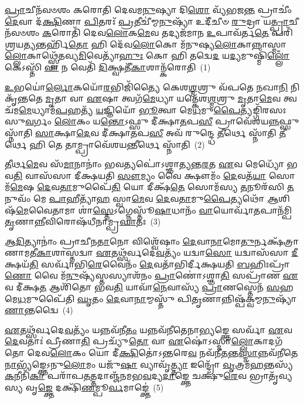 \setcounter{anuvakam}{0}
\-\ul{𑌪𑍍𑌰𑌾}\-𑌚𑍀𑌨᳴𑌵𑍞𑌶𑌂 𑌕𑌰𑍋𑌤𑌿 𑌦𑍇𑌵𑌮\-\ul{𑌨𑍁}\-𑌷𑍍𑌯𑌾 𑌦𑌿\-\ul{𑌶𑍋} 𑌵𑍍𑌯᳴𑌭𑌜\-\ul{𑌨𑍍𑌤} 𑌪𑍍𑌰𑌾𑌚𑍀𑌂॑ \ul{𑌦𑍇}\-𑌵𑌾 𑌦᳴\-\ul{𑌕𑍍𑌷𑌿}\-𑌣𑌾 \ul{𑌪𑌿}\-𑌤𑌰𑌃᳴ \ul{𑌪𑍍𑌰}\-𑌤𑍀𑌚𑍀॑𑌮𑍍𑌮\-\ul{𑌨𑍁}\-𑌷𑍍𑌯𑌾᳴ 𑌉𑌦𑍀᳴𑌚𑍀𑍞 \ul{𑌰𑍁}\-𑌦𑍍𑌰𑌾 𑌯\-\ul{𑌤𑍍𑌪𑍍𑌰𑌾}\-𑌚𑍀𑌨᳴𑌵𑍞𑌶𑌂 \ul{𑌕}\-𑌰𑍋𑌤𑌿᳴ 𑌦𑍇𑌵\-\ul{𑌲𑍋}\-𑌕\-\ul{𑌮𑍇}\-𑌵 𑌤𑌦𑍍𑌯𑌜᳴𑌮𑌾𑌨 \ul{𑌉}\-𑌪𑌾𑌵᳴𑌰𑍍𑌤\-\ul{𑌤𑍇} 𑌪𑌰𑌿᳴ 𑌶𑍍𑌰𑌯\-\ul{𑌤𑍍𑌯}\-𑌨𑍍𑌤𑌰𑍍\mbox{}𑌹𑌿᳴\-\ul{𑌤𑍋} 𑌹𑌿 𑌦𑍇᳴𑌵\-\ul{𑌲𑍋}\-𑌕𑍋 𑌮᳴𑌨𑍁𑌷𑍍𑌯\-\ul{𑌲𑍋}\-𑌕𑌾\-𑌨𑍍𑌨𑌾𑌸𑍍𑌮𑌾\-\ul{𑌲𑍍𑌲𑍋}\-𑌕𑌾𑌥𑍍𑌸𑍍𑌵𑍇᳴𑌤𑌵𑍍𑌯\-\ul{𑌮𑌿}\-𑌵𑍇𑌤𑍍𑌯𑌾᳴\-\ul{𑌹𑍁𑌃} 𑌕𑍋 𑌹𑌿 𑌤𑌦𑍍𑌵𑍇\-\ul{𑌦} 𑌯\-\ul{𑌦𑍍𑌯}\-𑌮𑍁𑌷𑍍𑌮𑌿᳴\-\ul{𑌲𑍍𑌲𑍋𑌁}\-𑌕𑍇\-𑌽𑌸𑍍𑌤𑌿᳴ \ul{𑌵𑌾} 𑌨 𑌵𑍇𑌤𑌿᳴ \ul{𑌦𑌿}\-𑌕𑍍𑌷𑍍𑌵𑌤𑍀᳴\-\ul{𑌕𑌾}\-𑌶𑌾𑌨𑍍𑌕᳴𑌰𑍋𑌤𑌿~(1)

\-\ul{𑌉}\-𑌭𑌯𑍋॑\-\ul{𑌰𑍍𑌲𑍋}\-𑌕𑌯𑍋᳴\-\ul{𑌰}\-𑌭𑌿𑌜𑌿᳴𑌤𑍍𑌯𑍈 𑌕𑍇𑌶\-\ul{𑌶𑍍𑌮}\-𑌶𑍍𑌰𑍁 𑌵᳴𑌪𑌤𑍇 \ul{𑌨}\-𑌖𑌾\-\ul{𑌨𑌿} 𑌨𑌿 𑌕𑍃᳴𑌨𑍍𑌤𑌤𑍇 \ul{𑌮𑍃}\-𑌤𑌾 𑌵𑌾 \ul{𑌏}\-𑌷𑌾 𑌤𑍍𑌵𑌗᳴\-\ul{𑌮𑍇}\-𑌧𑍍𑌯𑌾 𑌯𑌤𑍍𑌕𑍇᳴𑌶\-\ul{𑌶𑍍𑌮}\-𑌶𑍍𑌰𑍁 \ul{𑌮𑍃}\-𑌤𑌾\-\ul{𑌮𑍇}\-𑌵 𑌤𑍍𑌵𑌚᳴𑌮\-\ul{𑌮𑍇}\-𑌧𑍍𑌯𑌾𑌮᳴\-\ul{𑌪}\-𑌹𑌤𑍍𑌯᳴ \ul{𑌯}\-𑌜𑍍𑌞𑌿𑌯𑍋᳴ \ul{𑌭𑍂}\-𑌤𑍍𑌵𑌾 𑌮𑍇\-\ul{𑌧}\-𑌮𑍁\-\ul{𑌪𑍈}\-𑌤𑍍𑌯𑌙𑍍𑌗𑌿᳴𑌰𑌸𑌃 𑌸𑍁\-\ul{𑌵}\-𑌰𑍍𑌗𑌂 \ul{𑌲𑍋}\-𑌕𑌂 𑌯\-\ul{𑌨𑍍𑌤𑍋}\-\-𑌽𑌫𑍍𑌸𑍁 𑌦𑍀॑𑌕𑍍𑌷𑌾\-\ul{𑌤}\-𑌪\-\ul{𑌸𑍀} 𑌪𑍍𑌰𑌾𑌵𑍇᳴𑌶𑌯\-\ul{𑌨𑍍𑌨}\-𑌫𑍍𑌸𑍁 𑌸𑍍𑌨𑌾᳴𑌤𑌿 \ul{𑌸𑌾}\-𑌕𑍍𑌷𑌾\-\ul{𑌦𑍇}\-𑌵 𑌦𑍀॑𑌕𑍍𑌷𑌾\-\ul{𑌤}\-𑌪\-\ul{𑌸𑍀} 𑌅𑌵᳴ 𑌰𑍁𑌨𑍍𑌦𑍍𑌧𑍇 \ul{𑌤𑍀}\-𑌰𑍍𑌥𑍇 𑌸𑍍𑌨𑌾᳴𑌤𑌿 \ul{𑌤𑍀}\-𑌰𑍍𑌥𑍇 𑌹𑌿 𑌤𑍇 𑌤𑌾𑌮𑍍𑌪𑍍𑌰𑌾𑌵𑍇᳴𑌶𑌯\-\ul{𑌨𑍍𑌤𑍀}\-𑌰𑍍𑌥𑍇 𑌸𑍍𑌨𑌾᳴𑌤𑌿~(2)

\-\ul{𑌤𑍀}\-𑌰𑍍𑌥\-\ul{𑌮𑍇}\-𑌵 𑌸᳴\-\ul{𑌮𑌾}\-𑌨𑌾𑌨𑌾𑌂॑ 𑌭𑌵\-\ul{𑌤𑍍𑌯}\-𑌪𑍋॑\-𑌽𑌶𑍍𑌞𑌾𑌤𑍍𑌯𑌨𑍍𑌤\-\ul{𑌰}\-𑌤 \ul{𑌏}\-𑌵 𑌮𑍇𑌧𑍍𑌯𑍋᳴ 𑌭𑌵\-\ul{𑌤𑌿} 𑌵𑌾𑌸᳴𑌸𑌾 𑌦𑍀𑌕𑍍𑌷𑌯𑌤𑌿 \ul{𑌸𑍗}\-𑌮𑍍𑌯𑌂 𑌵𑍈 𑌕𑍍𑌷𑍗𑌮𑌂᳴ \ul{𑌦𑍇}\-𑌵𑌤᳴\-\ul{𑌯𑌾} 𑌸𑍋𑌮᳴\-\ul{𑌮𑍇}\-𑌷 \ul{𑌦𑍇}\-𑌵\-\ul{𑌤𑌾}\-𑌮𑍁𑌪𑍈᳴\-\ul{𑌤𑌿} 𑌯𑍋 𑌦𑍀𑌕𑍍𑌷᳴\-\ul{𑌤𑍇} 𑌸𑍋𑌮᳴𑌸𑍍𑌯 \ul{𑌤}\-𑌨𑍂𑌰᳴𑌸𑌿 \ul{𑌤}\-𑌨𑍁𑌵𑌂᳴ 𑌮𑍇 \ul{𑌪𑌾}\-𑌹𑍀𑌤𑍍𑌯𑌾᳴\-\ul{𑌹} 𑌸𑍍𑌵𑌾\-\ul{𑌮𑍇}\-𑌵 \ul{𑌦𑍇}\-𑌵\-\ul{𑌤𑌾}\-𑌮𑍁\-\ul{𑌪𑍈}\-𑌤𑍍𑌯𑌥𑍋᳴ \ul{𑌆}\-𑌶𑌿𑌷᳴\-\ul{𑌮𑍇}\-𑌵𑍈𑌤𑌾𑌮𑌾 𑌶𑌾॑\-\ul{𑌸𑍍𑌤𑍇}\-\-𑌽𑌗𑍍𑌨𑍇𑌸𑍍𑌤𑍂᳴\-\ul{𑌷𑌾}\-𑌧𑌾𑌨𑌂᳴ \ul{𑌵𑌾}\-𑌯𑍋𑌰𑍍𑌵𑌾᳴\-\ul{𑌤}\-𑌪𑌾𑌨᳴𑌮𑍍𑌪𑌿\-\ul{𑌤𑍃}\-𑌣𑌾\-\ul{𑌨𑍍𑌨𑍀}\-𑌵𑌿𑌰𑍋𑌷᳴𑌧𑍀𑌨𑌾𑌮𑍍𑌪𑍍𑌰\-\ul{𑌘𑌾}\-𑌤𑌃~(3)

\-\ul{𑌆}\-\-\ul{𑌦𑌿}\-𑌤𑍍𑌯𑌾𑌨𑌾𑌂॑ 𑌪𑍍𑌰𑌾𑌚𑍀𑌨\-\ul{𑌤𑌾}\-𑌨𑍋 𑌵𑌿𑌶𑍍𑌵𑍇᳴𑌷𑌾𑌂 \ul{𑌦𑍇}\-𑌵𑌾\-\ul{𑌨𑌾}\-𑌮𑍋\-\ul{𑌤𑍁}\-𑌰𑍍𑌨𑌕𑍍𑌷᳴𑌤𑍍𑌰𑌾𑌣𑌾𑌮𑌤𑍀\-\ul{𑌕𑌾}\-𑌶𑌾𑌸𑍍𑌤𑌦𑍍𑌵𑌾 \ul{𑌏}\-𑌤𑌥𑍍𑌸᳴𑌰𑍍𑌵𑌦𑍇\-\ul{𑌵}\-𑌤𑍍𑌯𑌂᳴ 𑌯𑌦𑍍𑌵𑌾\-\ul{𑌸𑍋} 𑌯𑌦𑍍𑌵𑌾𑌸᳴𑌸𑌾 \ul{𑌦𑍀}\-𑌕𑍍𑌷𑌯᳴\-\ul{𑌤𑌿} 𑌸𑌰𑍍𑌵𑌾᳴𑌭𑌿\-\ul{𑌰𑍇}\-𑌵𑍈𑌨𑌂᳴ \ul{𑌦𑍇}\-𑌵𑌤𑌾᳴𑌭𑌿𑌰𑍍𑌦𑍀𑌕𑍍𑌷𑌯𑌤𑌿 \ul{𑌬}\-𑌹𑌿𑌃𑌪𑍍𑌰𑌾᳴\-\ul{𑌣𑍋} 𑌵𑍈 𑌮᳴\-\ul{𑌨𑍁}\-𑌷𑍍𑌯᳴𑌸𑍍𑌤𑌸𑍍𑌯𑌾𑌶᳴𑌨𑌂 \ul{𑌪𑍍𑌰𑌾}\-𑌣𑍋॑\-𑌽𑌶𑍍𑌞𑌾\-\ul{𑌤𑌿} 𑌸𑌪𑍍𑌰𑌾᳴𑌣 \ul{𑌏}\-𑌵 𑌦𑍀॑𑌕𑍍𑌷\-\ul{𑌤} 𑌆𑌶𑌿᳴𑌤𑍋 𑌭𑌵\-\ul{𑌤𑌿} 𑌯𑌾𑌵𑌾᳴\-\ul{𑌨𑍇}\-𑌵𑌾𑌸𑍍𑌯᳴ \ul{𑌪𑍍𑌰𑌾}\-𑌣𑌸𑍍𑌤𑍇𑌨᳴ \ul{𑌸}\-𑌹 𑌮𑍇\-\ul{𑌧}\-𑌮𑍁𑌪𑍈᳴𑌤𑌿 \ul{𑌘𑍃}\-𑌤𑌂 \ul{𑌦𑍇}\-𑌵𑌾\-\ul{𑌨𑌾}\-𑌮𑍍𑌮𑌸𑍍𑌤𑍁᳴ 𑌪𑌿\-\ul{𑌤𑍃}\-𑌣𑌾𑌨𑍍𑌨𑌿𑌷𑍍𑌪᳴𑌕𑍍𑌵𑌮𑍍𑌮\-\ul{𑌨𑍁}\-𑌷𑍍𑌯𑌾᳴\-\ul{𑌣𑌾}\-𑌨𑍍𑌤𑌦𑍍𑌵𑍈~(4)

\-\ul{𑌏}\-𑌤𑌥𑍍𑌸᳴𑌰𑍍𑌵𑌦𑍇\-\ul{𑌵}\-𑌤𑍍𑌯𑌂᳴ 𑌯𑌨𑍍𑌨𑌵᳴𑌨𑍀\-\ul{𑌤𑌂} 𑌯𑌨𑍍𑌨𑌵᳴𑌨𑍀𑌤𑍇𑌨𑌾\-\ul{𑌭𑍍𑌯}\-𑌙𑍍𑌕𑍍𑌤𑍇 𑌸𑌰𑍍𑌵𑌾᳴ \ul{𑌏}\-𑌵 \ul{𑌦𑍇}\-𑌵𑌤𑌾𑌃॑ 𑌪𑍍𑌰𑍀𑌣𑌾\-\ul{𑌤𑌿} 𑌪𑍍𑌰𑌚𑍍𑌯𑍁᳴\-\ul{𑌤𑍋} 𑌵𑌾 \ul{𑌏}\-𑌷𑍋॑\-𑌽𑌸𑍍𑌮𑌾\-\ul{𑌲𑍍𑌲𑍋}\-𑌕𑌾𑌦𑌗᳴𑌤𑍋 𑌦𑍇𑌵\-\ul{𑌲𑍋}\-𑌕𑌂 𑌯𑍋 𑌦𑍀॑\-\ul{𑌕𑍍𑌷𑌿}\-𑌤𑍋॑\-𑌽\-\ul{𑌨𑍍𑌤}\-𑌰𑍇\-\ul{𑌵} 𑌨𑌵᳴𑌨𑍀\-\ul{𑌤}\-𑌨𑍍𑌤\-\ul{𑌸𑍍𑌮𑌾}\-𑌨𑍍𑌨𑌵᳴𑌨𑍀𑌤𑍇\-\ul{𑌨𑌾}\-𑌭𑍍𑌯᳴𑌙𑍍𑌕𑍍𑌤𑍇\-𑌽𑌨𑍁\-\ul{𑌲𑍋}\-𑌮𑌂 𑌯𑌜𑍁᳴\-\ul{𑌷𑌾} 𑌵𑍍𑌯𑌾𑌵𑍃᳴\-\ul{𑌤𑍍𑌤𑍍𑌯𑌾} 𑌇𑌨𑍍𑌦𑍍𑌰𑍋᳴ \ul{𑌵𑍃}\-𑌤𑍍𑌰𑌮᳴\-\ul{𑌹}\-𑌨𑍍𑌤𑌸𑍍𑌯᳴ \ul{𑌕}\-𑌨𑍀𑌨𑌿᳴\-\ul{𑌕𑌾} 𑌪𑌰𑌾᳴𑌪\-\ul{𑌤}\-𑌤𑍍𑌤𑌦𑌾𑌞𑍍𑌜᳴𑌨𑌮𑌭\-\ul{𑌵}\-𑌦𑍍𑌯\-\ul{𑌦𑌾}\-𑌙𑍍𑌕𑍍𑌤𑍇 𑌚𑌕𑍍𑌷𑍁᳴\-\ul{𑌰𑍇}\-𑌵 𑌭𑍍𑌰𑌾𑌤𑍃᳴𑌵𑍍𑌯𑌸𑍍𑌯 𑌵𑍃\-\ul{𑌙𑍍𑌕𑍍𑌤𑍇} 𑌦𑌕𑍍𑌷𑌿᳴\-\ul{𑌣}\-𑌮𑍍𑌪𑍂\-\ul{𑌰𑍍𑌵}\-𑌮𑌾𑌙𑍍𑌕𑍍𑌤𑍇॑~(5)

